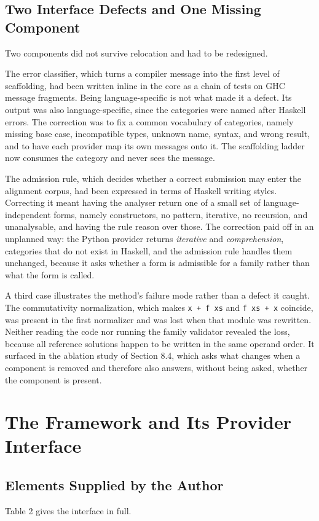 \documentclass[10pt,twocolumn,letterpaper]{article}
\begin{document}
\subsection{Two Interface Defects and One Missing Component}
Two components did not survive relocation and had to be redesigned.

The error classifier, which turns a compiler message into the first
level of scaffolding, had been written inline in the core as a chain of
tests on GHC message fragments. Being language-specific is not what made
it a defect. Its output was also language-specific, since the categories
were named after Haskell errors. The correction was to fix a common
vocabulary of categories, namely missing base case, incompatible types,
unknown name, syntax, and wrong result, and to have each provider map
its own messages onto it. The scaffolding ladder now consumes the
category and never sees the message.

The admission rule, which decides whether a correct submission may enter
the alignment corpus, had been expressed in terms of Haskell writing
styles. Correcting it meant having the analyser return one of a small
set of language-independent forms, namely constructors, no pattern,
iterative, no recursion, and unanalysable, and having the rule reason
over those. The correction paid off in an unplanned way: the Python
provider returns \emph{iterative} and \emph{comprehension}, categories
that do not exist in Haskell, and the admission rule handles them
unchanged, because it asks whether a form is admissible for a family
rather than what the form is called.

A third case illustrates the method's failure mode rather than a defect
it caught. The commutativity normalization, which makes
\texttt{x + f xs} and \texttt{f xs + x} coincide, was present in
the first normalizer and was lost when that module was rewritten.
Neither reading the code nor running the family validator revealed the
loss, because all reference solutions happen to be written in the same
operand order. It surfaced in the ablation study of Section 8.4, which
asks what changes when a component is removed and therefore also
answers, without being asked, whether the component is present.

\section{The Framework and Its Provider Interface}
\subsection{Elements Supplied by the Author}
Table 2 gives the interface in full.
\end{document}
